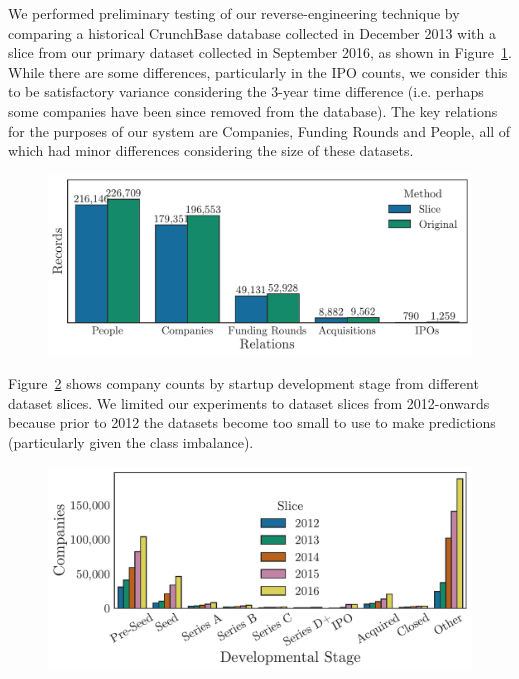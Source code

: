 \documentclass[../thesis/thesis.tex]{subfiles}
\begin{document}
We performed preliminary testing of our reverse-engineering technique by comparing a historical CrunchBase database collected in December 2013 with a slice from our primary dataset collected in September 2016, as shown in Figure~\ref{fig:design:2013_slice_comparison}. While there are some differences, particularly in the IPO counts, we consider this to be satisfactory variance considering the 3-year time difference (i.e. perhaps some companies have been since removed from the database). The key relations for the purposes of our system are Companies, Funding Rounds and People, all of which had minor differences considering the size of these datasets.

\begin{figure}[!htb]
    \centering
    \includegraphics[width=\textwidth]{../figures/design/2013_slice_comparison}
    \caption[Dataset slice compared with original dataset]{}
    \label{fig:design:2013_slice_comparison}
\end{figure}

Figure~\ref{fig:design:slice_counts_over_time} shows company counts by startup development stage from different dataset slices. We limited our experiments to dataset slices from 2012-onwards because prior to 2012 the datasets become too small to use to make predictions (particularly given the class imbalance).

\begin{figure}[!htb]
    \centering
    \includegraphics[width=\textwidth]{../figures/design/slice_counts_over_time}
    \caption[Dataset counts over time]{}
    \label{fig:design:slice_counts_over_time}
\end{figure}
\end{document}
